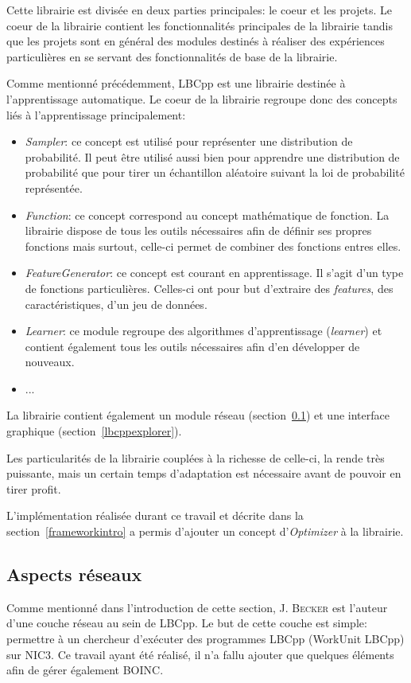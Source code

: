 \documentclass[a4paper, 12pt]{report}
\begin{document}
Cette librairie est divisée en deux parties principales: le coeur et les projets. Le coeur de la librairie contient les fonctionnalités principales de la librairie tandis que les projets sont en général des modules destinés à réaliser des expériences particulières en se servant des fonctionnalités de base de la librairie.

Comme mentionné précédemment, LBCpp est une librairie destinée à l'apprentissage automatique. Le coeur de la librairie regroupe donc des concepts liés à l'apprentissage principalement:
\begin{itemize}
\item \textit{Sampler}: ce concept est utilisé pour représenter une distribution de probabilité. Il peut être utilisé aussi bien pour apprendre une distribution de probabilité que pour tirer un échantillon aléatoire suivant la loi de probabilité représentée.
\item \textit{Function}: ce concept correspond au concept mathématique de fonction. La librairie dispose de tous les outils nécessaires afin de définir ses propres fonctions mais surtout, celle-ci permet de combiner des fonctions entres elles.
\item \textit{FeatureGenerator}: ce concept est courant en apprentissage. Il s'agit d'un type de fonctions particulières. Celles-ci ont pour but d'extraire des \textit{features}, des caractéristiques, d'un jeu de données.
\item \textit{Learner}: ce module regroupe des algorithmes d'apprentissage (\textit{learner}) et contient également tous les outils nécessaires afin d'en développer de nouveaux.
\item ... 
\end{itemize} 
La librairie contient également un module réseau (section~\ref{lbcppreseau}) et une interface graphique (section~\ref{lbcppexplorer}).

Les particularités de la librairie couplées à la richesse de celle-ci, la rende très puissante, mais un certain temps d'adaptation est nécessaire avant de pouvoir en tirer profit.

L'implémentation réalisée durant ce travail et décrite dans la section~\ref{frameworkintro} a permis d'ajouter un concept d'\textit{Optimizer} à la librairie.


\subsection{Aspects réseaux}
\label{lbcppreseau}
Comme mentionné dans l'introduction de cette section, J. \textsc{Becker} est l'auteur d'une couche réseau au sein de LBCpp. Le but de cette couche est simple: permettre à un chercheur d'exécuter des programmes LBCpp (WorkUnit LBCpp) sur NIC3. Ce travail ayant été réalisé, il n'a fallu ajouter que quelques éléments afin de gérer également \textsc{BOINC}.
\end{document}
